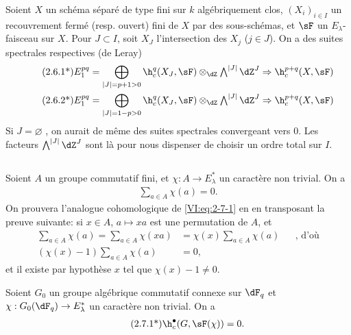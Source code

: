 Soient $X$ un schéma séparé de type fini sur $k$ algébriquement clos, 
$(X_i)_{i\in I}$ un recouvrement fermé (resp. ouvert) fini de $X$ par des 
sous-schémas, et $\sF$ un $E_\lambda$-faisceau sur $X$. Pour $J\subset I$, 
soit $X_J$ l'intersection des $X_j$ ($j\in J$). On a des suites spectrales 
respectives (de Leray) 
\begin{align*}\tag{2.6.1*}\label{VI:eq:2-6-1*}
  E_1^{p q} &= \bigoplus_{|J|=p+1>0} \h_c^q(X_J,\sF) \otimes_\dZ \textstyle\bigwedge^{|J|} \dZ^J \Rightarrow \h_c^{p+q}(X,\sF) \\ 
  \tag{2.6.2*}\label{VI:eq:2-6-2*}
  E_1^{p q} &= \bigoplus_{|J|=1-p>0} \h_c^q(X_J,\sF) \otimes_\dZ \textstyle\bigwedge^{|J|} \dZ^J \Rightarrow \h_c^{p+q}(X,\sF)
\end{align*}
Si $J=\varnothing$ , on aurait de même des suites 
spectrales convergeant vers $0$. Les facteurs $\bigwedge^{|J|} \dZ^J$ sont là 
pour nous dispenser de choisir un ordre total sur $I$. 





\subsection{}\label{VI:2-7}

Soient $A$ un groupe commutatif fini, et $\chi:A \to E_\lambda^\ast$ un 
caractère non trivial. On a 
\begin{align*}\tag{2.7.1}\label{VI:eq:2-7-1}
  \sum_{a\in A} \chi(a) = 0 \text{.}
\end{align*}
On prouvera l'analogue cohomologique de \eqref{VI:eq:2-7-1} en en transposant 
la preuve suivante: si $x\in A$, $a\mapsto x a$ est une permutation de $A$, et 
\begin{align*}
  \sum_{a\in A}\chi(a) = \sum_{a\in A} \chi(x a) &= \chi(x) \sum_{a\in A} \chi(a) && \text{, d'où} \\
  (\chi(x)-1)\sum_{a\in A}\chi(a) &= 0 \text{,}
\end{align*}
et il existe par hypothèse $x$ tel que $\chi(x)-1\ne 0$. 





\begin{theorem*}[2.7*]\label{VI:2-7*}
Soient $G_0$ un groupe algébrique commutatif connexe sur $\dF_q$ et 
$\chi:G_0(\dF_q) \to E_\lambda^\ast$ un caractère non trivial. On a 
\begin{align*}\tag{2.7.1*}\label{VI:eq:2-7-1*}
  \h_c^\bullet(G,\sF(\chi)) = 0 \text{.}
\end{align*}
\end{theorem*}

